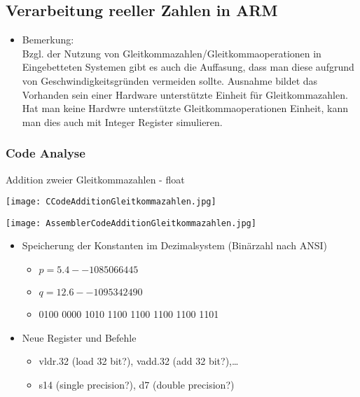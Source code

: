 	\subsection{Verarbeitung reeller Zahlen in ARM}
		\begin{itemize}
			\item Bemerkung: \\
				Bzgl. der Nutzung von Gleitkommazahlen/Gleitkommaoperationen in Eingebetteten Systemen
				gibt es auch die Auffasung, dass man diese aufgrund von Geschwindigkeitsgründen vermeiden sollte.
				Ausnahme bildet das Vorhanden sein einer Hardware unterstützte Einheit für Gleitkommazahlen.
				Hat man keine Hardwre unterstützte Gleitkommaoperationen Einheit, kann man dies auch mit Integer
				Register simulieren.
		\end{itemize}

		\subsubsection{Code Analyse}
			\centerline{Addition zweier Gleitkommazahlen - float}
			\begin{minipage}{0.5\textwidth}
				\begin{center}
					\texttt{[image: CCodeAdditionGleitkommazahlen.jpg]}
				\end{center}
			\end{minipage}
			\begin{minipage}{0.45\textwidth}
				\begin{center}
					\texttt{[image: AssemblerCodeAdditionGleitkommazahlen.jpg]}
				\end{center}
			\end{minipage}

			\begin{itemize}
				\item Speicherung der Konstanten im Dezimalsystem (Binärzahl nach ANSI)
					\begin{itemize}
						\item $p = 5.4 -- 1085066445$
						\item $q = 12.6 -- 1095342490$
						\item 0100 0000 1010 1100 1100 1100 1100 1101
					\end{itemize}
				\item Neue Register und Befehle
					\begin{itemize}
						\item vldr.32 (load 32 bit?), vadd.32 (add 32 bit?),\dots
						\item s14 (single precision?), d7 (double precision?)
					\end{itemize}
			\end{itemize}


